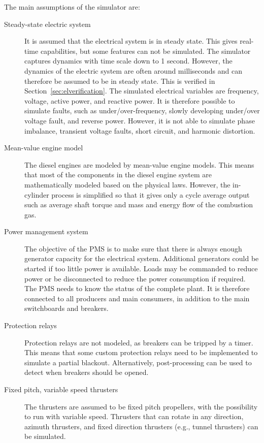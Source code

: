 \documentclass[journal]{IEEEtran}
\begin{document}
The main assumptions of the simulator are:
\begin{description}
\item[Steady-state electric system ] It is assumed that the electrical system is in steady state. This gives real-time capabilities, but some features can not be simulated.
The simulator captures dynamics with time scale down to 1 second.
However, the dynamics of the electric system are often around milliseconds and can therefore be assumed to be in steady state.
This is verified in Section~\ref{sec:elverification}.
The simulated electrical variables are frequency, voltage, active power, and reactive power.
It is therefore possible to simulate faults, such as under/over-frequency, slowly developing under/over voltage fault, and reverse power.
However, it is not able to simulate phase imbalance, transient voltage faults, short circuit, and harmonic distortion.
\item[Mean-value engine model] The diesel engines are modeled by mean-value engine models. This means that most of the components in the diesel engine system are mathematically modeled based on the physical laws. 
However, the in-cylinder process is simplified so that it gives only a cycle average output such as average shaft torque and mass and energy flow of the combustion gas.
\item[Power management system] The objective of the PMS is to make sure that there is always enough generator capacity for the electrical system. 
Additional generators could be started if too little power is available.
Loads may be commanded to reduce power or be disconnected to reduce the power consumption if required.
The PMS needs to know the status of the complete plant.
It is therefore connected to all producers and main consumers, in addition to the main switchboards and breakers.
\item[Protection relays] Protection relays are not modeled, as breakers can be tripped by a timer.
This means that some custom protection relays need to be implemented to simulate a partial blackout.
Alternatively, post-processing can be used to detect when breakers should be opened.
\item[Fixed pitch, variable speed thrusters] The thrusters are assumed to be fixed pitch propellers, with the possibility to run with variable speed.
Thrusters that can rotate in any direction, azimuth thrusters, and fixed direction thrusters (e.g., tunnel thrusters) can be simulated.
\end{description}
\end{document}
